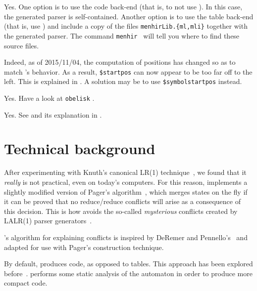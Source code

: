 \documentclass[onecolumn,11pt,nocopyrightspace,preprint]{sigplanconf}
\begin{document}
Yes. One option is to use the code back-end (that is, to not
use \otable). In this case, the generated parser is self-contained. Another
option is to use the table back-end (that is, use \otable) and include a
copy of the files \verb+menhirLib.{ml,mli}+ together with the generated
parser. The command \texttt{menhir \osuggestmenhirlib} will tell you where to
find these source files.

 Indeed, as of 2015/11/04, the computation of
positions has changed so as to match \ocamlyacc's behavior. As a result,
\texttt{\$startpos} can now appear to be too far off to the left. This is
explained in . A solution may be to use
\verb+$symbolstartpos+ instead.

Yes. Have a look at \texttt{obelisk} \cite{obelisk}.

 Yes.
See  and its explanation in .


\section{Technical background}

After experimenting with Knuth's canonical LR(1) technique~\cite{knuth-lr-65},
we found that it \emph{really} is not practical, even on today's computers.
For this reason, \menhir implements a slightly modified version of Pager's
algorithm~\cite{pager-77}, which merges states on the fly if it can be proved
that no reduce/reduce conflicts will arise as a consequence of this decision.
This is how \menhir avoids the so-called \emph{mysterious} conflicts created
by LALR(1) parser generators~\cite[section 5.7]{bison}.

\menhir's algorithm for explaining conflicts is inspired by DeRemer and
Pennello's~\cite{deremer-pennello-82} and adapted for use with Pager's
construction technique.

By default, \menhir produces code, as opposed to tables. This approach has
been explored before~\cite{bhamidipaty-proebsting-98,horspool-faster-90}.
\menhir performs some static analysis of the automaton in order to produce
more compact code.
\end{document}
